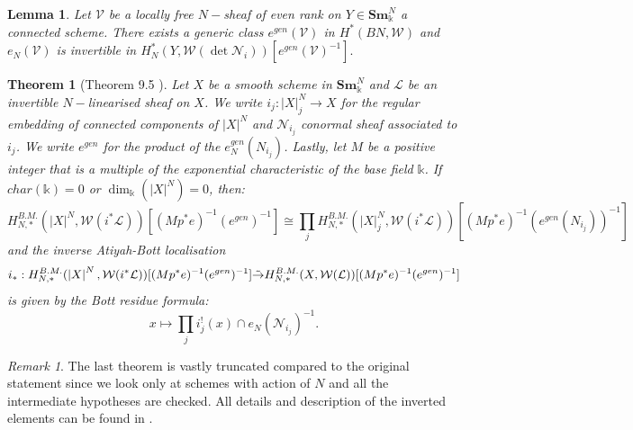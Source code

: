 \documentclass{amsart}
\theoremstyle{plain}%
\newtheorem{tho}[subsubsection]{Theorem}
\newtheorem{lemme}[subsubsection]{Lemma}
\theoremstyle{remark}
\newtheorem{rmq}[subsubsection]{Remark}
\theoremstyle{definition}
\newcommand{\cL}{\mathcal{L}}
\newcommand{\cN}{\mathscr{N}}
\newcommand{\cV}{\mathcal{V}}
\newcommand{\cW}{\mathcal{W}}
\newcommand{\ek}{\mathbb{k}}
\newcommand{\isomr}{\Tilde{\to}}
\newcommand{\vabs}[1]{\left| #1\right|}
\begin{document}
\begin{lemme}\label{LEM - classe generique et inversibilite}
Let $\cV$ be a locally free $N-$sheaf of even rank on $Y \in \mathbf{Sm}^N_\ek$ a connected scheme. There exists a generic class $e^{gen}(\cV)$ in $H^{\ast}(BN,\cW)$ and $e_N(\cV)$ is invertible in $H^\ast_N(Y,\cW(\det \cN_i))[e^{gen}(\cV)^{-1}].$
\end{lemme}

\begin{tho}[Theorem 9.5 \cite{LevineAB24}]\label{THO - residu Bott}
Let $X$ be a smooth scheme in $\mathbf{Sm}^N_\ek$ and $\cL$ be an invertible $N-$linearised sheaf on $X$. We write $i_j : \vabs{X}_j^N \to X$ for the regular embedding of connected components of $\vabs{X}^N$ and $\cN_{i_j}$ conormal sheaf associated to $i_j$. We write $e^{gen}$ for the product of the $e_N^{gen}(N_{i_j})$. Lastly, let $M$ be a positive integer that is a multiple of the exponential characteristic of the base field $\ek$. If $char(\ek)=0$ or $\dim_\ek(\vabs{X}^N) = 0$, then:
\[H^{B.M.}_{N,\ast}(\vabs{X}^N,\cW(i^\ast \cL))[(Mp^\ast e)^{-1}(e^{gen})^{-1}] \cong \prod_j H^{B.M.}_{N,\ast}(\vabs{X}^N_j,\cW(i^\ast \cL))[(Mp^\ast e)^{-1}(e^{gen}(N_{i_j}))^{-1}]\]
and the inverse Atiyah-Bott localisation
\[i_\ast : H^{B.M.}_{N,\ast}(\vabs{X}^N,\cW(i^\ast \cL))[(Mp^\ast e)^{-1}( e^{gen})^{-1}] \isomr H^{B.M.}_{N,\ast}(X,\cW(\cL))[(Mp^\ast e)^{-1}(e^{gen})^{-1}]\]
is given by the Bott residue formula:
\[x \mapsto \prod_j i_j^!(x) \cap e_N(\cN_{i_j})^{-1}.\]
\end{tho}


\begin{rmq}
The last theorem is vastly truncated compared to the original statement since we look only at schemes with action of $N$ and all the intermediate hypotheses are checked. All details and description of the inverted elements can be found in \cite[Section 9]{LevineAB24}.
\end{rmq}
\end{document}
